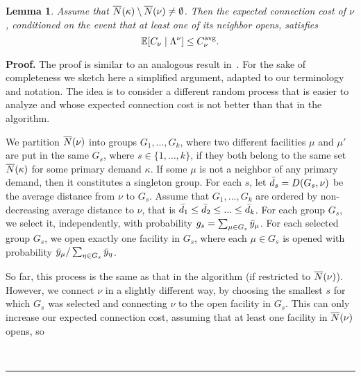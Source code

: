 \documentclass[oneside,final]{ucr}
\newtheorem{lemma}[theorem]{Lemma}
\newenvironment{proof}[1][Proof]{\textbf{#1.} }{\ \rule{0.5em}{0.5em}}
\begin{document}
\begin{lemma}\label{lem: echs expected C_nu}
Assume that ${\overline{N}}(\kappa) \setminus {\overline{N}}(\nu) \neq \emptyset$.
Then the expected connection cost of $\nu$, conditioned on the event that at least one of 
its neighbor opens, satisfies
%
\begin{equation*}
  \mathbb{E}[C_\nu \mid \Lambda^\nu] \leq C^{{\mbox{\scriptsize\rm avg}}}_{\nu}.
\end{equation*}
\end{lemma}
\begin{proof}
The proof is similar to an analogous result in~\cite{ChudakS04,ByrkaA10}. 
For the sake of completeness we sketch here a simplified argument, adapted to our
terminology and notation.
The idea is to consider a different random process that is
easier to analyze and whose expected connection cost is not better than that in
the algorithm.

We partition ${\overline{N}}(\nu)$ into groups $G_1,...,G_k$, where two
different facilities $\mu$ and $\mu'$ are put in the same $G_s$, where
$s\in \{1,\ldots,k\}$, if they both belong to the same set
${\overline{N}}(\kappa)$ for some primary demand $\kappa$. If some $\mu$ is
not a neighbor of any primary demand, then it constitutes a singleton
group.  For each $s$, let ${\bar d}_s = D(G_s,\nu)$ be the average
distance from $\nu$ to $G_s$.  Assume that $G_1,...,G_k$ are ordered
by non-decreasing average distance to $\nu$, that is ${\bar d}_1 \le
{\bar d}_2 \le ... \le {\bar d}_k$.  For each group $G_s$, we select it,
independently, with probability $g_s = \sum_{\mu\in G_s}{\bar y}_{\mu}$.
For each selected group $G_s$,  we
open exactly one facility in $G_s$, where each $\mu\in G_s$
is opened with probability ${\bar y}_{\mu}/\sum_{\eta\in G_s}
{\bar y}_{\eta}$.

So far, this process is the same as that in the algorithm (if restricted to ${\overline{N}}(\nu)$).
However, we connect $\nu$ in a slightly different way, by choosing the smallest
$s$ for which $G_s$ was selected and connecting $\nu$ to the open facility in $G_s$.
This can only increase our expected connection cost, assuming that at least one
facility in ${\overline{N}}(\nu)$ opens, so


\end{proof}
\end{document}
